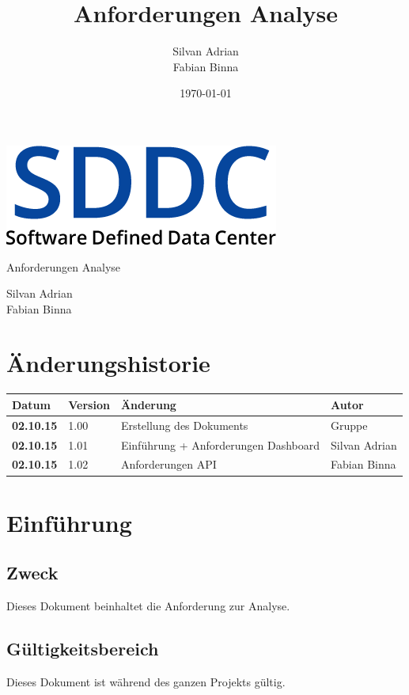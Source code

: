 \documentclass[11pt]{scrartcl}
\title{Anforderungen Analyse}
\author{Silvan Adrian \\ Fabian Binna}
\date{\today{}}
\begin{document}
\def\arraystretch{1.5}
\begin{titlepage}
\begin{center}
\vspace{10em}
\includegraphics[scale=2]{SDDC}
\vspace{10em}
\end{center}
\begin{center}
\huge {Anforderungen Analyse}
\end{center}
\begin{center}
\vspace{10em}
\LARGE {Silvan Adrian} \\
\LARGE {Fabian Binna}
\end{center}

\end{titlepage}

\newpage
\section{Änderungshistorie}
\begin{tabularx}{\linewidth}{l l X l}
\textbf{Datum} & \textbf{Version} & \textbf{Änderung}  & \textbf{Autor} \\
\hline
\textbf{02.10.15} & 1.00 & Erstellung des Dokuments & Gruppe \\
\textbf{02.10.15} & 1.01 & Einführung + Anforderungen Dashboard & Silvan Adrian\\
\textbf{02.10.15} & 1.02 & Anforderungen API & Fabian Binna\\
\end{tabularx}

\newpage
\tableofcontents
\newpage

\section{Einführung}
\subsection{Zweck}
Dieses Dokument beinhaltet die Anforderung zur Analyse.
\subsection{Gültigkeitsbereich}
Dieses Dokument ist während des ganzen Projekts gültig.
\end{document}
